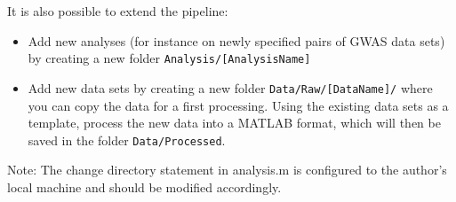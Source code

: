 \documentclass[english,11pt]{article} %
\begin{document}
It is also possible to extend the pipeline: 
\begin{itemize}
\item Add new analyses (for instance on newly specified pairs of GWAS data sets) by creating a new folder \verb+Analysis/[AnalysisName]+
\item Add new data sets by creating a new folder \verb+Data/Raw/[DataName]/+ where you can copy the data for a first processing. Using the existing data sets as a template, process the new data into a MATLAB format, which will then be saved in the folder \verb+Data/Processed+.
\end{itemize}

Note: The change directory statement in analysis.m is configured to the author's local machine and should be modified accordingly.



\end{document}
